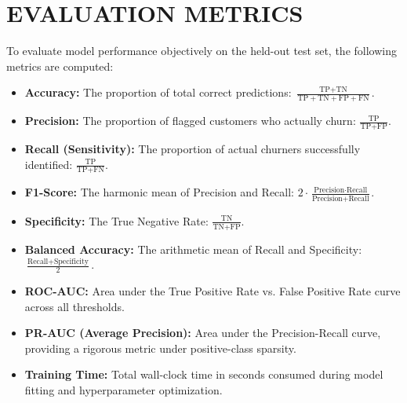 \documentclass[12pt,a4paper]{report}
\begin{document}
\section{EVALUATION METRICS}
To evaluate model performance objectively on the held-out test set, the following metrics are computed:
\begin{itemize}
    \item \textbf{Accuracy:} The proportion of total correct predictions: $\frac{\text{TP} + \text{TN}}{\text{TP} + \text{TN} + \text{FP} + \text{FN}}$.
    \item \textbf{Precision:} The proportion of flagged customers who actually churn: $\frac{\text{TP}}{\text{TP} + \text{FP}}$.
    \item \textbf{Recall (Sensitivity):} The proportion of actual churners successfully identified: $\frac{\text{TP}}{\text{TP} + \text{FN}}$.
    \item \textbf{F1-Score:} The harmonic mean of Precision and Recall: $2 \cdot \frac{\text{Precision} \cdot \text{Recall}}{\text{Precision} + \text{Recall}}$.
    \item \textbf{Specificity:} The True Negative Rate: $\frac{\text{TN}}{\text{TN} + \text{FP}}$.
    \item \textbf{Balanced Accuracy:} The arithmetic mean of Recall and Specificity: $\frac{\text{Recall} + \text{Specificity}}{2}$.
    \item \textbf{ROC-AUC:} Area under the True Positive Rate vs. False Positive Rate curve across all thresholds.
    \item \textbf{PR-AUC (Average Precision):} Area under the Precision-Recall curve, providing a rigorous metric under positive-class sparsity.
    \item \textbf{Training Time:} Total wall-clock time in seconds consumed during model fitting and hyperparameter optimization.
\end{itemize}
\end{document}
